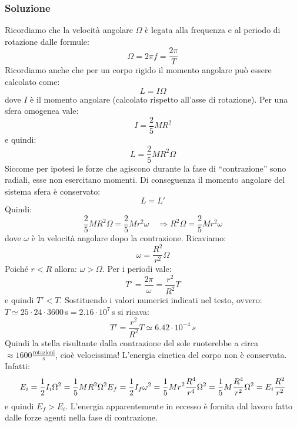 \documentclass[12pt,a4paper]{book}
\begin{document}
\subsubsection*{Soluzione}
Ricordiamo che la velocità angolare $\Omega$ è legata alla frequenza e al periodo di rotazione dalle formule:
\begin{equation*}
\Omega=2\pi f=\frac{2\pi}{T}
\end{equation*}
Ricordiamo anche che per un corpo rigido il momento angolare può essere calcolato come:
\begin{equation*}
L=I \Omega 
\end{equation*}
dove $I$ è il momento angolare (calcolato rispetto all'asse di rotazione). Per una sfera omogenea vale:
\begin{equation*}
I=\frac{2}{5} M R^2
\end{equation*}
e quindi:
\begin{equation*}
L=\frac{2}{5} M R^2 \Omega 
\end{equation*}
Siccome per ipotesi le forze che agiscono durante la fase di ``contrazione'' sono radiali, esse non esercitano momenti. Di conseguenza il momento angolare
del sistema sfera è conservato:
\begin{equation*}
L=L' 
\end{equation*}
Quindi:
\begin{equation*}
\frac{2}{5} M R^2 \Omega = \frac{2}{5} M r^2 \omega \quad \Rightarrow R^2 \Omega = \frac{2}{5} M r^2 \omega
\end{equation*}
dove $\omega$ è la velocità angolare dopo la contrazione. Ricaviamo:
\begin{equation*}
\omega=\frac{R^2}{r^2} \Omega 
\end{equation*}
Poiché $r<R$ allora: $\omega>\Omega$. Per i periodi vale:
\begin{equation*}
T'=\frac{2\pi}{\omega}=\frac{r^2}{R^2} T
\end{equation*}
e quindi $T'<T$. Sostituendo i valori numerici indicati nel testo, ovvero: $T\simeq 25 \cdot 24 \cdot 3600\,$s$=2.16\cdot 10^7 \,$s
si ricava:
\begin{equation*}
T'=\frac{r^2}{R^2} T \simeq 6.42 \cdot 10^{-4} \, s
\end{equation*}
Quindi la stella risultante dalla contrazione del sole ruoterebbe a circa $\approx 1600 \frac{\text{rotazioni}}{\text{s}}$, cioè velocissima! 
L'energia cinetica del corpo non è conservata. Infatti:
\begin{equation*}
E_i=\frac{1}{2} I_i \Omega^2=\frac{1}{5} M R^2 \Omega^2 \\
E_f=\frac{1}{2} I_f \omega^2= \frac{1}{5} M r^2 \frac{R^4}{r^4} \Omega^2=\frac{1}{5} M \frac{R^4}{r^2} \Omega^2 =E_i  \frac{R^2}{r^2}
\end{equation*}
e quindi $E_f>E_i$.  L'energia apparentemente in eccesso è fornita dal lavoro fatto dalle forze agenti nella fase di contrazione. \\
\end{document}
